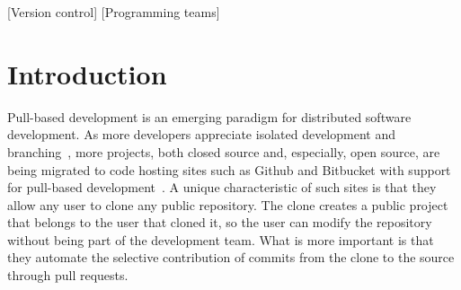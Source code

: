 \documentclass{sig-alternate}
\begin{document}
[Version control]
[Programming teams]



\section{Introduction}

%

Pull-based development is an emerging paradigm for distributed software
development. As more developers appreciate isolated
development and branching~\cite{Bird12}, more projects, both closed source and,
especially, open source, are being migrated to code hosting sites such as Github
and Bitbucket with support for pull-based development~\cite{Barr12}. A unique
characteristic of such sites is that they allow any user to clone any public
repository. The clone creates a public project that belongs to the user that
cloned it, so the user can modify the repository without being part of the
development team. What is more important is that they automate the selective
contribution of commits from the clone to the source through pull requests. 
\end{document}
